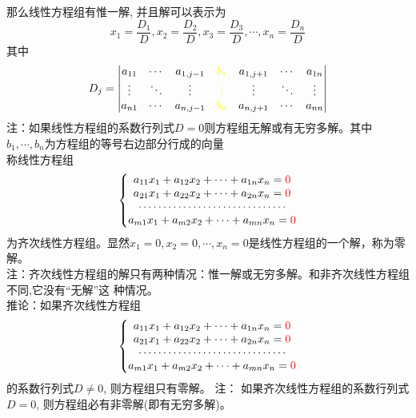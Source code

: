  那么线性方程组有惟一解, 并且解可以表示为
$$
{{x}_{1}}=\frac{{{D}_{1}}}{D},
{{x}_{2}}=\frac{{{D}_{2}}}{D},
{{x}_{3}}=\frac{{{D}_{3}}}{D},\cdots,
{{x}_{n}}=\frac{{{D}_{n}}}{D}
$$
其中
$$
{{D}_{j}}=\left| \begin{matrix}
    {{a}_{11}} & \cdots  & {{a}_{1,j-1}} & {\color{yellow}{{b}_{1}}} & {{a}_{1,j+1}} & \cdots  & {{a}_{1n}}  \\
    \vdots  & {\ddots} & \vdots          & {\color{yellow}\vdots}  & \vdots  & {\ddots} & \vdots   \\
    {{a}_{n1}} & \cdots  & {{a}_{n,j-1}} & {\color{yellow}{{b}_{n}}} & {{a}_{n,j+1}} & \cdots  & {{a}_{nn}}  \\
 \end{matrix} \right| 
$$
{\color{red}注：}如果线性方程组的系数行列式$D=0$则方程组无解或有无穷多解。其中$b_{1},\cdots,b_{n}$为方程组的等号右边部分行成的向量\\
称线性方程组
$$
\left\{ \begin{matrix}
    {{a}_{11}}{{x}_{1}}+{{a}_{12}}{{x}_{2}}+\cdots +{{a}_{1n}}{{x}_{n}}={\color{red}0}  \\
    {{a}_{21}}{{x}_{1}}+{{a}_{22}}{{x}_{2}}+\cdots +{{a}_{2n}}{{x}_{n}}={\color{red}0}  \\
    \cdots \cdots \cdots \cdots \cdots \cdots \cdots \cdots \cdots \cdots   \\
    {{a}_{m1}}{{x}_{1}}+{{a}_{m2}}{{x}_{2}}+\cdots +{{a}_{mn}}{{x}_{n}}={\color{red}0}  \\
 \end{matrix} \right. 
$$
为{\color{red}齐次}线性方程组。显然$x_{1}=0,x_{2}=0,\cdots,x_{n}=0$是线性方程组的一个解，称为{\color{blue}零解}。\\
{\color{red}注：}齐次线性方程组的解只有两种情况：惟一解或无穷多解。和非齐次线性方程组不同,它没有“无解”这
种情况。\\
{\color{blue}推论：}如果齐次线性方程组
$$
\left\{ \begin{matrix}
    {{a}_{11}}{{x}_{1}}+{{a}_{12}}{{x}_{2}}+\cdots +{{a}_{1n}}{{x}_{n}}={\color{red}0}  \\
    {{a}_{21}}{{x}_{1}}+{{a}_{22}}{{x}_{2}}+\cdots +{{a}_{2n}}{{x}_{n}}={\color{red}0}  \\
    \cdots \cdots \cdots \cdots \cdots \cdots \cdots \cdots \cdots \cdots   \\
    {{a}_{m1}}{{x}_{1}}+{{a}_{m2}}{{x}_{2}}+\cdots +{{a}_{mn}}{{x}_{n}}={\color{red}0}  \\
 \end{matrix} \right. 
$$
的系数行列式$D\ne 0$,  则方程组只有零解。
{\color{red}注：} 如果齐次线性方程组的系数行列式$D=0$, 则方程组必有非零解(即有无穷多解)。\\



  



